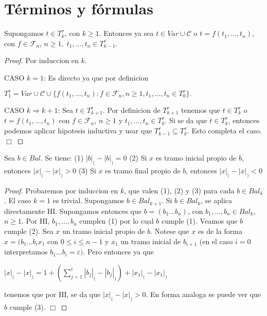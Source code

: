 \section{Términos y fórmulas}

  \begin{lemma}
    Supongamos \(t\in T_{k}^{\tau }\), con \(k\geq 1\). Entonces ya sea \(t\in Var\cup \mathcal{C}\) o \(t=f(t_{1},...,t_{n})\), con \(f\in \mathcal{F }_{n}\), \(n\geq 1,\;t_{1},...,t_{n}\in T_{k-1}^{\tau }\).
  \end{lemma}
  \begin{proof}
    Por induccion en \(k\).

    CASO \(k=1\): Es directo ya que por definicion

    \(\displaystyle T_{1}^{\tau }=Var\cup \mathcal{C}\cup \{f(t_{1},...,t_{n}):f\in \mathcal{F} _{n},n\geq 1,t_{1},...,t_{n}\in T_{0}^{\tau }\}. \)

    CASO \(k\Rightarrow k+1\): Sea \(t\in T_{k+1}^{\tau }\). Por definicion de \( T_{k+1}^{\tau }\) tenemos que \(t\in T_{k}^{\tau }\) o \(t=f(t_{1},...,t_{n})\) con \(f\in \mathcal{F}_{n}\), \(n\geq 1\) y \(t_{1},...,t_{n}\in T_{k}^{\tau }\). Si se da que \(t\in T_{k}^{\tau }\), entonces podemos aplicar hipotesis inductiva y usar que \(T_{k-1}^{\tau }\subseteq T_{k}^{\tau }\). Esto completa el caso. \(\Box\)
  \end{proof}

  \begin{lemma}
    Sea \(b\in Bal\). Se tiene:
    (1) \(\left\vert b\right\vert _{(}-\left\vert b\right\vert _{)}=0\)
    (2) Si \(x\) es tramo inicial propio de \(b\), entonces \(\left\vert x\right\vert _{(}-\left\vert x\right\vert _{)} >0\)
    (3) Si \(x\) es tramo final propio de \(b\), entonces \(\left\vert x\right\vert _{(}-\left\vert x\right\vert _{)}< 0\)
  \end{lemma}
  \begin{proof}
    Probaremos por induccion en \(k\), que valen (1), (2) y (3) para cada \(b\in Bal_{k}\). El caso \(k=1\) es trivial. Supongamos \(b\in Bal_{k+1}\). Si \(b\in Bal_{k}\), se aplica directamente HI. Supongamos entonces que \( b=(b_{1}...b_{n})\), con \(b_{1},...,b_{n}\in Bal_{k}\), \(n\geq 1\). Por HI, \( b_{1},...,b_{n}\) cumplen (1) por lo cual \(b\) cumple (1). Veamos que \(b\) cumple (2). Sea \(x\) un tramo inicial propio de \(b\). Notese que \(x\) es de la forma \(x=(b_{1}...b_{i}x_{1}\) con \(0\leq i\leq n-1\) y \(x_{1}\) un tramo inicial de \(b_{i+1}\) (en el caso \(i=0\) interpretamos \(b_{1}...b_{i}= \varepsilon )\). Pero entonces ya que

    \(\displaystyle \left\vert x\right\vert _{(}-\left\vert x\right\vert _{)}=1+\left( \sum_{j=1}^{i}\left\vert b_{j}\right\vert _{(}-\left\vert b_{j}\right\vert _{)}\right) +\left\vert x_{1}\right\vert _{(}-\left\vert x_{1}\right\vert _{)} \)

    tenemos que por HI, se da que \(\left\vert x\right\vert _{(}-\left\vert x\right\vert _{)} >0\). En forma analoga se puede ver que \(b\) cumple (3). \(\Box\)
  \end{proof}

